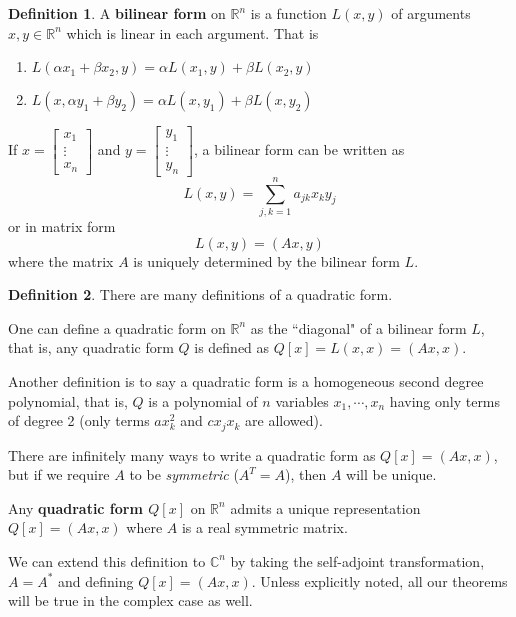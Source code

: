 \documentclass[a4paper,10pt]{book}
\newcommand{\R}{\mathbb{R}}
\newcommand{\C}{\mathbb{C}}
\theoremstyle{plain}
\theoremstyle{plain}
\theoremstyle{definition}
\newtheorem{definition}{Definition}[section]
\begin{document}
\begin{definition}
A \textbf{bilinear form} on $\R^{n}$ is a function $L(x, y)$ of arguments $x, y \in \R^{n}$ which is linear in each argument. That is 
\begin{enumerate}
	\item $L(\alpha x_{1} + \beta x_{2}, y) = \alpha L(x_{1}, y) + \beta L(x_{2}, y)$
	\item $L(x, \alpha y_{1} + \beta y_{2}) = \alpha L(x, y_{1}) + \beta L(x, y_{2})$
\end{enumerate}

If $x = \begin{bmatrix}
x_{1} \\
\vdots \\
x_{n}
\end{bmatrix}$ and $y = \begin{bmatrix}
y_{1} \\
\vdots \\
y_{n}
\end{bmatrix}$, a bilinear form can be written as 
$$L(x, y) = \sum_{j, k = 1}^{n} a_{jk} x_{k} y_{j}$$
or in matrix form 
$$L(x, y) = (Ax, y)$$
where the matrix $A$ is uniquely determined by the bilinear form $L$.
\end{definition}

\begin{definition}
There are many definitions of a quadratic form. 

One can define a quadratic form on $\R^{n}$ as the ``diagonal" of a bilinear form $L$, that is, any quadratic form $Q$ is defined as $Q[x] = L(x, x) = (Ax, x)$. 

Another definition is to say a quadratic form is a homogeneous second degree polynomial, that is, $Q$ is a polynomial of $n$ variables $x_{1}, \cdots, x_{n}$ having only terms of degree 2 (only terms $ax_{k}^{2}$ and $cx_{j} x_{k}$ are allowed).

There are infinitely many ways to write a quadratic form as $Q[x] = (Ax, x)$, but if we require $A$ to be \textit{symmetric} ($A^{T} = A$), then $A$ will be unique. 

Any \textbf{quadratic form $Q[x]$} on $\R^{n}$ admits a unique representation $Q[x] = (Ax, x)$ where $A$ is a real symmetric matrix. 

We can extend this definition to $\C^{n}$ by taking the self-adjoint transformation, $A = A^{*}$ and defining $Q[x] = (Ax, x)$. Unless explicitly noted, all our theorems will be true in the complex case as well. 

\end{definition}
\end{document}
